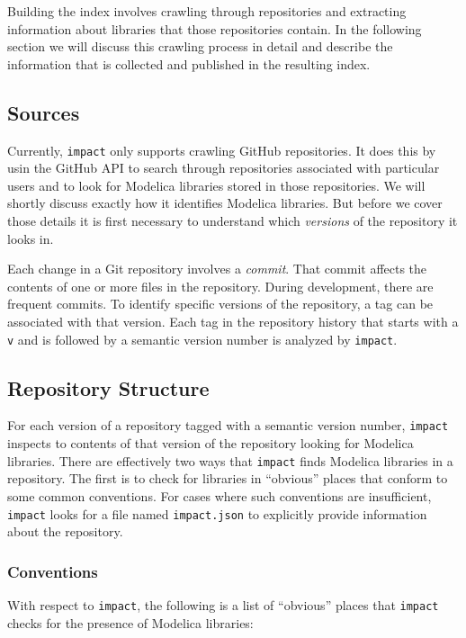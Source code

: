 \documentclass[11pt,a4paper,twocolumn]{article}
\newcommand{\code}[1]{\texttt{#1}} %
\begin{document}
Building the index involves crawling through repositories and
extracting information about libraries that those repositories
contain.  In the following section we will discuss this crawling
process in detail and describe the information that is collected and
published in the resulting index.

\subsection{Sources}

Currently, \code{impact} only supports crawling GitHub\parencite{github}
repositories.  It does this by usin the GitHub API\parencite{gh-api} to
search through repositories associated with particular users and to
look for Modelica libraries stored in those repositories.  We will
shortly discuss exactly how it identifies Modelica libraries.  But
before we cover those details it is first necessary to understand
which \emph{versions} of the repository it looks in.

Each change in a Git repository involves a \emph{commit}.  That commit
affects the contents of one or more files in the repository.  During
development, there are frequent commits.  To identify specific
versions of the repository, a tag can be associated with that
version.  Each tag in the repository history that starts with a
\code{v} and is followed by a semantic version number is analyzed by
\code{impact}.

\subsection{Repository Structure}

For each version of a repository tagged with a semantic version
number, \code{impact} inspects to contents of that version of the
repository looking for Modelica libraries.  There are effectively two
ways that \code{impact} finds Modelica libraries in a repository.  The
first is to check for libraries in ``obvious'' places that conform to
some common conventions.  For cases where such conventions are
insufficient, \code{impact} looks for a file named \code{impact.json}
to explicitly provide information about the repository.

\subsubsection{Conventions}

With respect to \code{impact}, the following is a list of ``obvious''
places that \code{impact} checks for the presence of Modelica
libraries:
\end{document}
